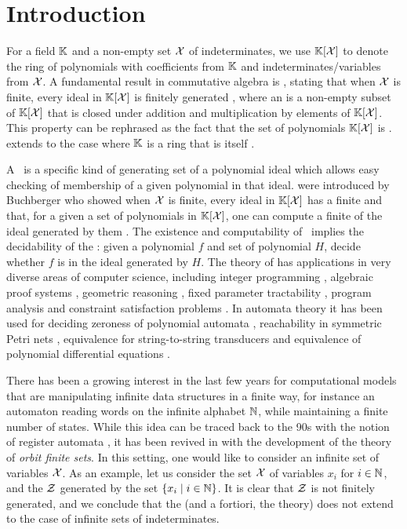 \section{Introduction}
\label{sec:intro}


\AP For a field $\mathbb{K}$ and a non-empty set $\mathcal{X}$ of indeterminates, we use
$\mathbb{K}[\mathcal{X}]$ to denote the ring of polynomials with coefficients from $\mathbb{K}$
and indeterminates/variables from $\mathcal{X}$. A fundamental result in commutative
algebra is , stating that when $\mathcal{X}$ is finite,
every ideal in $\mathbb{K}[\mathcal{X}]$ is finitely generated \cite{HILB1890}, where an
 is a non-empty subset of $\mathbb{K}[\mathcal{X}]$ that is closed under
addition and multiplication by elements of $\mathbb{K}[\mathcal{X}]$. This property can
be rephrased as the fact that the set of polynomials $\mathbb{K}[\mathcal{X}]$ is
.  extends to the case where $\mathbb{K}$
is a ring that is itself  \cite[Theorem 4.1]{Lang02}.

\AP A \intro*\Grb\ is a specific kind of generating set of a polynomial ideal
which allows easy checking of membership of a given polynomial in that ideal.
 were introduced by Buchberger who showed when $\mathcal{X}$ is
finite, every ideal in $\mathbb{K}[\mathcal{X}]$ has a finite  and
that, for a given a set of polynomials in $\mathbb{K}[\mathcal{X}]$, one can compute a
finite  of the ideal generated by them \cite{BUCH76}. The
existence and computability of \Grbs\ implies the decidability of the
: given a polynomial $f$ and set of polynomial
$H$, decide whether $f$ is in the ideal generated by $H$. The theory of
 has applications in very diverse areas of computer
science, including integer programming \cite{Sturmfels96}, algebraic proof
systems \cite{algProof}, geometric reasoning \cite{Cox2015chGeom}, fixed
parameter tractability \cite{ACDM22}, program analysis \cite{SSM04} and
constraint satisfaction problems \cite{Mas21}.
In automata theory it has been used for deciding zeroness of polynomial
automata \cite{BEDUSHWO17}, reachability in symmetric Petri nets \cite{MAME82},
equivalence for string-to-string transducers \cite{HONKALA00} and equivalence
of polynomial differential equations \cite{CLEMENTE24}. 

\AP There has been a growing interest in the last few years for computational
models that are manipulating infinite data structures in a finite way, for
instance an automaton reading words on the infinite alphabet $\mathbb{N}$, while
maintaining a finite number of states. While this idea can be traced back to
the 90s with the notion of register automata \cite{KAFR94}, it has been revived
in with the development of the theory of \emph{orbit finite sets}. In this
setting, one would like to consider an infinite set of variables $\mathcal{X}$. As an
example, let us consider the set $\mathcal{X}$ of variables $x_i$ for $i \in \mathbb{N}$, and
the  $\mathcal{Z}$ generated by the set $\{ x_i \mid i \in \mathbb{N} \}$. It is
clear that $\mathcal{Z}$ is not finitely generated, and we conclude that the
 (and a fortiori, the 
theory) does not extend to the case of infinite sets of indeterminates.

